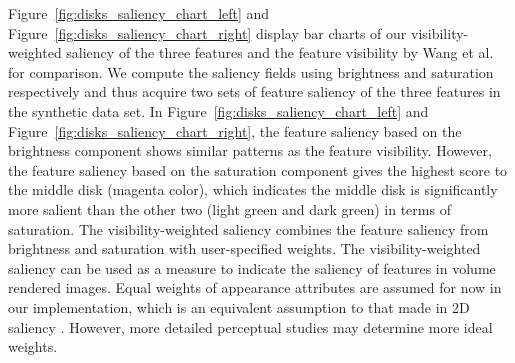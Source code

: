 Figure~\ref{fig:disks_saliency_chart_left} and Figure~\ref{fig:disks_saliency_chart_right} display bar charts of our visibility-weighted saliency of the three features and the feature visibility by Wang et al. \cite{wang_efficient_2011} for comparison.
We compute the saliency fields using brightness and saturation respectively and thus acquire two sets of feature saliency of the three features in the synthetic data set.
In Figure~\ref{fig:disks_saliency_chart_left} and Figure~\ref{fig:disks_saliency_chart_right}, the feature saliency based on the brightness component shows similar patterns as the feature visibility. However, the feature saliency based on the saturation component gives the highest score to the middle disk (magenta color), which indicates the middle disk is significantly more salient than the other two (light green and dark green) in terms of saturation. The visibility-weighted saliency combines the feature saliency from brightness and saturation with user-specified weights. 
The visibility-weighted saliency can be used as a measure to indicate the saliency of features in volume rendered images.
Equal weights of appearance attributes are assumed for now in our implementation, which is an equivalent assumption to that made in 2D saliency \cite{itti_model_1998}. However, more detailed perceptual studies may determine more ideal weights.

